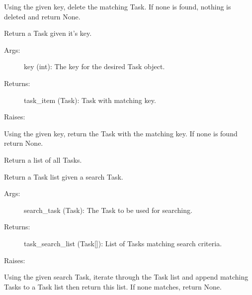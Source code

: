 \documentclass[letterpaper,10pt,english]{sphinxmanual}
\begin{document}
\begin{fulllineitems}
\begin{fulllineitems}
Using the given key, delete the matching Task. If none is found,
nothing is deleted and return None.

\end{fulllineitems}



\begin{fulllineitems}
\label{index:storage.GTaskStorage.find}
Return a Task given it's key.
\begin{description}
\item[{Args:}] \leavevmode
key (int): The key for the desired Task object.

\item[{Returns:}] \leavevmode
task\_item (Task): Task with matching key.

\end{description}

Raises:

Using the given key, return the Task with the matching key. If none
is found return None.

\end{fulllineitems}



\begin{fulllineitems}
\label{index:storage.GTaskStorage.get_all}
Return a list of all Tasks.

\end{fulllineitems}



\begin{fulllineitems}
\label{index:storage.GTaskStorage.search}
Return a Task list given a search Task.
\begin{description}
\item[{Args:}] \leavevmode
search\_task (Task): The Task to be used for searching.

\item[{Returns:}] \leavevmode
task\_search\_list (Task{[}{]}): List of Tasks matching search criteria.

\end{description}

Raises:

Using the given search Task, iterate through the Task list and append
matching Tasks to a Task list then return this list. If none matches,
return None.


\end{fulllineitems}
\end{fulllineitems}
\end{document}
